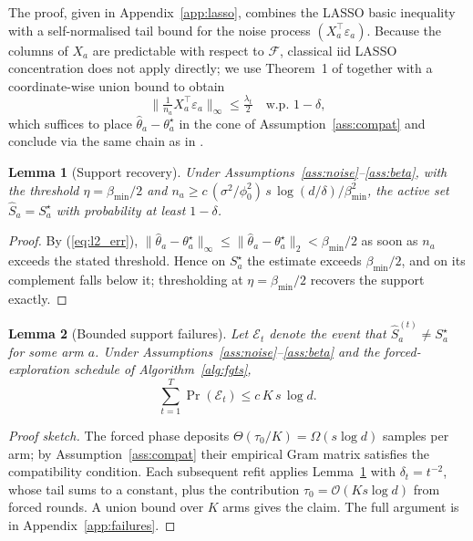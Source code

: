 \documentclass[journal,twoside,web]{ieeecolor}
\newtheorem{lemma}{Lemma}
\begin{document}
The proof, given in Appendix~\ref{app:lasso}, combines the LASSO basic inequality with a self-normalised tail bound for the noise process $(X_a^\top \varepsilon_a)$. Because the columns of $X_a$ are predictable with respect to $\mathcal{F}$, classical iid LASSO concentration does not apply directly; we use Theorem~1 of \cite{abbasi2011improved} together with a coordinate-wise union bound to obtain
\[
\Big\| \tfrac{1}{n_a} X_a^\top \varepsilon_a \Big\|_\infty \leq \tfrac{\lambda_t}{2} \quad \text{w.p. } 1 - \delta,
\]
which suffices to place $\hat\theta_a - \theta^\star_a$ in the cone of Assumption~\ref{ass:compat} and conclude via the same chain as in \cite[Thm.~6.1]{vandegeer2009conditions}.

\begin{lemma}[Support recovery]\label{lem:support}
Under Assumptions~\ref{ass:noise}--\ref{ass:beta}, with the threshold $\eta = \beta_{\min}/2$ and $n_a \geq c\,(\sigma^2/\phi_0^2)\, s\,\log(d/\delta)/\beta_{\min}^2$, the active set $\hat{S}_a = S^{\star}_a$ with probability at least $1-\delta$.
\end{lemma}

\begin{proof}
By (\ref{eq:l2_err}), $\|\hat\theta_a - \theta^{\star}_a\|_\infty \leq \|\hat\theta_a - \theta^{\star}_a\|_2 < \beta_{\min}/2$ as soon as $n_a$ exceeds the stated threshold. Hence on $S^{\star}_a$ the estimate exceeds $\beta_{\min}/2$, and on its complement falls below it; thresholding at $\eta = \beta_{\min}/2$ recovers the support exactly.
\end{proof}

\begin{lemma}[Bounded support failures]\label{lem:failures}
Let $\mathcal{E}_t$ denote the event that $\hat{S}_a^{(t)} \neq S^{\star}_a$ for some arm $a$. Under Assumptions~\ref{ass:noise}--\ref{ass:beta} and the forced-exploration schedule of Algorithm~\ref{alg:fgts},
\[
\sum_{t=1}^T \Pr(\mathcal{E}_t) \leq c\,K\,s\,\log d.
\]
\end{lemma}

\begin{proof}[Proof sketch]
The forced phase deposits $\Theta(\tau_0/K) = \Omega(s\log d)$ samples per arm; by Assumption~\ref{ass:compat} their empirical Gram matrix satisfies the compatibility condition. Each subsequent refit applies Lemma~\ref{lem:support} with $\delta_t = t^{-2}$, whose tail sums to a constant, plus the contribution $\tau_0 = \mathcal{O}(Ks\log d)$ from forced rounds. A union bound over $K$ arms gives the claim. The full argument is in Appendix~\ref{app:failures}.
\end{proof}
\end{document}
